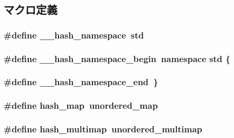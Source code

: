 \subsection{マクロ定義}
\hypertarget{hashmap_8hh_a753a3f3f4a7bc29763dc4931f699de56}{
\subsubsection[{\_\-\_\-hash\_\-namespace}]{\setlength{\rightskip}{0pt plus 5cm}\#define \_\-\_\-hash\_\-namespace~std}}
\label{hashmap_8hh_a753a3f3f4a7bc29763dc4931f699de56}
\hypertarget{hashmap_8hh_a6d9c8851148dfa7e5b7f65373c4eb87a}{
\subsubsection[{\_\-\_\-hash\_\-namespace\_\-begin}]{\setlength{\rightskip}{0pt plus 5cm}\#define \_\-\_\-hash\_\-namespace\_\-begin~namespace std \{}}
\label{hashmap_8hh_a6d9c8851148dfa7e5b7f65373c4eb87a}
\hypertarget{hashmap_8hh_a1dc86c73a247ef8b54cdb9eff7aeb723}{
\subsubsection[{\_\-\_\-hash\_\-namespace\_\-end}]{\setlength{\rightskip}{0pt plus 5cm}\#define \_\-\_\-hash\_\-namespace\_\-end~\}}}
\label{hashmap_8hh_a1dc86c73a247ef8b54cdb9eff7aeb723}
\hypertarget{hashmap_8hh_ad06cc371f5697a73eab4c293546b4dba}{
\subsubsection[{hash\_\-map}]{\setlength{\rightskip}{0pt plus 5cm}\#define hash\_\-map~unordered\_\-map}}
\label{hashmap_8hh_ad06cc371f5697a73eab4c293546b4dba}
\hypertarget{hashmap_8hh_a046c232424330722fc22de4526cf067b}{
\subsubsection[{hash\_\-multimap}]{\setlength{\rightskip}{0pt plus 5cm}\#define hash\_\-multimap~unordered\_\-multimap}}
